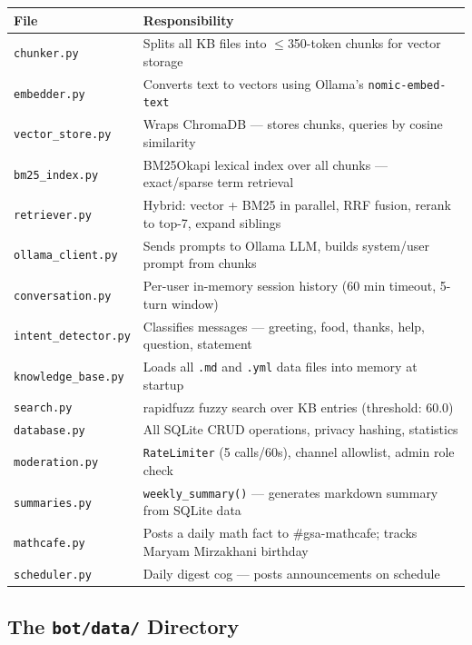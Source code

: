 \documentclass[12pt,letterpaper]{article}
\begin{document}
\begin{center}
\begin{longtable}{lp{9cm}}
\toprule
\textbf{File} & \textbf{Responsibility} \\
\midrule
\texttt{chunker.py} & Splits all KB files into $\leq$350-token chunks for vector storage \\
\texttt{embedder.py} & Converts text to vectors using Ollama's \texttt{nomic-embed-text} \\
\texttt{vector\_store.py} & Wraps ChromaDB — stores chunks, queries by cosine similarity \\
\texttt{bm25\_index.py} & BM25Okapi lexical index over all chunks — exact/sparse term retrieval \\
\texttt{retriever.py} & Hybrid: vector + BM25 in parallel, RRF fusion, rerank to top-7, expand siblings \\
\texttt{ollama\_client.py} & Sends prompts to Ollama LLM, builds system/user prompt from chunks \\
\texttt{conversation.py} & Per-user in-memory session history (60 min timeout, 5-turn window) \\
\texttt{intent\_detector.py} & Classifies messages — greeting, food, thanks, help, question, statement \\
\texttt{knowledge\_base.py} & Loads all \texttt{.md} and \texttt{.yml} data files into memory at startup \\
\texttt{search.py} & rapidfuzz fuzzy search over KB entries (threshold: 60.0) \\
\texttt{database.py} & All SQLite CRUD operations, privacy hashing, statistics \\
\texttt{moderation.py} & \texttt{RateLimiter} (5 calls/60s), channel allowlist, admin role check \\
\texttt{summaries.py} & \texttt{weekly\_summary()} — generates markdown summary from SQLite data \\
\texttt{mathcafe.py} & Posts a daily math fact to \#gsa-mathcafe; tracks Maryam Mirzakhani birthday \\
\texttt{scheduler.py} & Daily digest cog — posts announcements on schedule \\
\bottomrule
\end{longtable}
\end{center}

\subsection{The \texttt{bot/data/} Directory}
\end{document}
